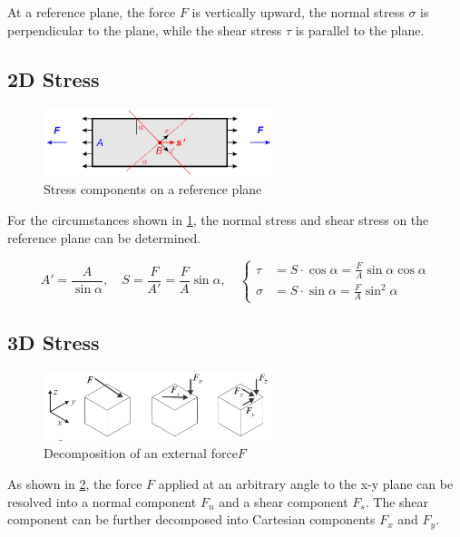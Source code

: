 \documentclass[en,hazy,cyan,8pt,normal]{elegantnote}
\numberwithin{equation}{section}
\begin{document}
    At a reference plane, the force $F$ is vertically upward, the normal stress $\sigma$ is perpendicular to the plane, while the shear stress $\tau$ is parallel to the plane.

  \subsection{2D Stress}\label{subsec:01.03}
    \begin{figure}[H]
      \centering
      \includegraphics[width=0.6\textwidth]{image/001.png}
      \caption{Stress components on a reference plane}
      \label{fig:001}
    \end{figure}

    For the circumstances shown in \cref{fig:001}, the normal stress and shear stress on the reference plane can be determined.

    \begin{equation}\label{eq:002}
      A'=\frac{A}{\sin \alpha}, \quad S=\frac{F}{A'}=\frac{F}{A} \sin \alpha,\quad
      \left\{
      \begin{aligned}
        \tau&=S\cdot\cos\alpha=\frac{F}{A} \sin \alpha \cos \alpha\\
        \sigma&=S\cdot\sin\alpha=\frac{F}{A} \sin^2 \alpha
      \end{aligned}
      \right.
    \end{equation}

  \subsection{3D Stress}\label{subsec:01.04}
    \begin{figure}[H]
      \centering
      \includegraphics[width=0.6\textwidth]{image/002.png}
      \caption{Decomposition of an external force$F$}
      \label{fig:002}
    \end{figure}

    As shown in \cref{fig:002}, the force $F$ applied at an arbitrary angle to the x-y plane can be resolved into a normal component $F_n$ and a shear component $F_s$. The shear component can be further decomposed into Cartesian components $F_x$ and $F_y$.
\end{document}
